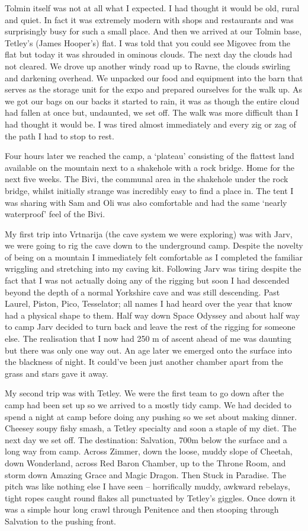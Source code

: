 Tolmin itself was not at all what I expected. I had thought it would be old, rural and quiet. In fact it was extremely modern with shops and restaurants and was surprisingly busy for such a small place. And then we arrived at our Tolmin base, Tetley’s (James Hooper’s) flat. I was told that you could see Migovec from the flat but today it was shrouded in ominous clouds. The next day the clouds had not cleared. We drove up another windy road up to Ravne, the clouds swirling and darkening overhead. We unpacked our food and equipment into the barn that serves as the storage unit for the expo and prepared ourselves for the walk up. As we got our bags on our backs it started to rain, it was as though the entire cloud had fallen at once but, undaunted, we set off. The walk was more difficult than I had thought it would be. I was tired almost immediately and every zig or zag of the path I had to stop to rest.

Four hours later we reached the camp, a ‘plateau’ consisting of the flattest land available on the mountain next to a shakehole with a rock bridge. Home for the next five weeks. The Bivi, the communal area in the shakehole under the rock bridge, whilst initially strange was incredibly easy to find a place in. The tent I was sharing with Sam and Oli was also comfortable and had the same ‘nearly waterproof’ feel of the Bivi.

My first trip into Vrtnarija (the cave system we were exploring) was with Jarv, we were going to rig the cave down to the underground camp. Despite the novelty of being on a mountain I immediately felt comfortable as I completed the familiar wriggling and stretching into my caving kit. Following Jarv was tiring despite the fact that I was not actually doing any of the rigging but soon I had descended beyond the depth of a normal Yorkshire cave and was still descending. Past Laurel, Piston, Pico, Tesselator; all names I had heard over the year that know had a physical shape to them. Half way down Space Odyssey and about half way to camp Jarv decided to turn back and leave the rest of the rigging for someone else. The realisation that I now had 250 m of ascent ahead of me was daunting but there was only one way out. An age later we emerged onto the surface into the blackness of night. It could’ve been just another chamber apart from the grass and stars gave it away.

My second trip was with Tetley. We were the first team to go down after the camp had been set up so we arrived to a mostly tidy camp. We had decided to spend a night at camp before doing any pushing so we set about making dinner. Cheesey soupy fishy smash, a Tetley specialty and soon a staple of my diet. The next day we set off. The destination: Salvation, 700m below the surface and a long way from camp. Across Zimmer, down the loose, muddy slope of Cheetah, down Wonderland, across Red Baron Chamber, up to the Throne Room, and storm down Amazing Grace and Magic Dragon. Then Stuck in Paradise. The pitch was like nothing else I have seen -- horrifically muddy, awkward rebelays, tight ropes caught round flakes all punctuated by Tetley’s giggles. Once down it was a simple hour long crawl through Penitence and then stooping through Salvation to the pushing front.

